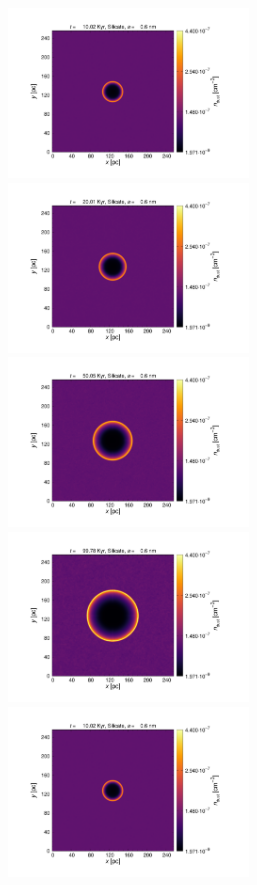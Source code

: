 \documentclass[fleqn,usenatbib]{mnras}
\begin{document}
    \begin{figure}
 \includegraphics[trim=2.8cm 1.5cm 9.3cm 2.0cm, clip=true,page=1,height = 4.5cm]{Pics/Pics_C1/Density_1_00041.pdf}\hspace*{-0.1cm}
 \includegraphics[trim=5.2cm 1.5cm 9.3cm 2.0cm, clip=true,page=1,height = 4.5cm]{Pics/Pics_C1/Density_1_00081.pdf}\hspace*{-0.1cm}
 \includegraphics[trim=5.2cm 1.5cm 9.3cm 2.0cm, clip=true,page=1,height = 4.5cm]{Pics/Pics_C1/Density_1_00201.pdf}\hspace*{-0.1cm}
 \includegraphics[trim=5.2cm 1.5cm 3.2cm 2.0cm, clip=true,page=1,height = 4.5cm]{Pics/Pics_C1/Density_1_00400.pdf}\\
  \includegraphics[trim=2.8cm 1.5cm 9.3cm 2.0cm, clip=true,page=2,height = 4.5cm]{Pics/Pics_C1/Density_1_00041.pdf}\hspace*{-0.1cm}

\end{figure}
\end{document}
